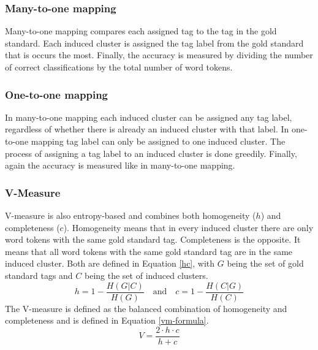 \documentclass[11pt]{article}
\begin{document}
{\subsubsection{Many-to-one mapping}
Many-to-one mapping compares each assigned tag to the tag in the gold standard. Each induced cluster is assigned the tag label from the gold standard that is occurs the most. Finally, the accuracy is measured by dividing the number of correct classifications by the total number of word tokens.

\subsubsection{One-to-one mapping}
In many-to-one mapping each induced cluster can be assigned any tag label, regardless of whether there is already an induced cluster with that label. In one-to-one mapping tag label can only be assigned to one induced cluster. The process of assigning a tag label to an induced cluster is done greedily. Finally, again the accuracy is measured like in many-to-one mapping.

\subsubsection{V-Measure}
V-measure is also entropy-based and combines both homogeneity ($h$) and completeness ($c$). Homogeneity means that in every induced cluster there are only word tokens with the same gold standard tag. Completeness is the opposite. It means that all word tokens with the same gold standard tag are in the same induced cluster. Both are defined in Equation \ref{hc}, with $G$ being the set of gold standard tags and $C$ being the set of induced clusters.
\begin{equation}\label{hc}
h = 1 - \frac{H(G|C)}{H(G)} \quad \textrm{and} \quad c = 1- \frac{H(C|G)}{H(C)}
\end{equation}
The V-measure is defined as the balanced combination of homogeneity and completeness and is defined in Equation \ref{vm-formula}.
\begin{equation}\label{vm-formula}
V = \frac{2 \cdot h\cdot c}{h + c}
\end{equation}

}
\end{document}
